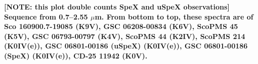{\bf [NOTE: this plot double counts SpeX and uSpeX observations]\\Sequence from 0.7–2.55 $\mu$m. From bottom to top, these spectra are of Sco 160900.7-19085 (K9V), GSC 06208-00834 (K6V), ScoPMS 45 (K5V), GSC 06793-00797 (K4V), ScoPMS 44 (K2IV), ScoPMS 214 (K0IV(e)), GSC 06801-00186 (uSpeX) (K0IV(e)), GSC 06801-00186 (SpeX) (K0IV(e)), CD-25 11942 (K0V).\label{fig:stack-plot-k}}
